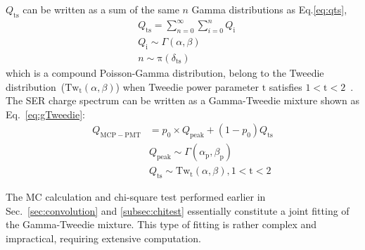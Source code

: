 $Q_{\mathrm{ts}}$ can be written as a sum of the same $n$ Gamma distributions as Eq.\eqref{eq:qts},
\begin{equation}
    \label{eq:qts}
    \begin{aligned}
         & Q_{\mathrm{ts}}=\sum_{n=0}^{\infty}\sum_{i=0}^{n}Q_{\mathrm{i}} \\
         & Q_{\mathrm{i}} \sim \varGamma(\alpha,\beta)                     \\
         & n \sim \mathrm{\pi}(\delta_{\mathrm{ts}})
    \end{aligned}
\end{equation}
which is a compound Poisson-Gamma distribution, belong to the Tweedie distribution~($\mathrm{Tw}_{\mathrm{t}}(\alpha,\beta)$)
when Tweedie power parameter $\mathrm{t}$ satisfies $1<\mathrm{t}<2$~\cite{Sen1997TheTO,1991Tweedie}.
The SER charge spectrum can be written as a Gamma-Tweedie mixture shown as Eq.~\eqref{eq:gTweedie}:
\begin{equation}
    \label{eq:gTweedie}
    \begin{aligned}
        Q_{\mathrm{MCP-PMT}} & = p_0\times Q_{\mathrm{peak}} + (1-p_0)Q_{\mathrm{ts}}                          \\
                             & Q_{\mathrm{peak}} \sim \varGamma(\alpha_{\mathrm{p}},\beta_{\mathrm{p}})        \\
                             & Q_{\mathrm{ts}} \sim \mathrm{Tw}_{\mathrm{t}}(\alpha,\beta),   1< \mathrm{t} <2
    \end{aligned}
\end{equation}


The MC calculation and chi-square test performed earlier in Sec.~\ref{sec:convolution} and \ref{subsec:chitest}
essentially constitute a joint fitting of the Gamma-Tweedie mixture.
This type of fitting is rather complex and impractical, requiring extensive computation.


